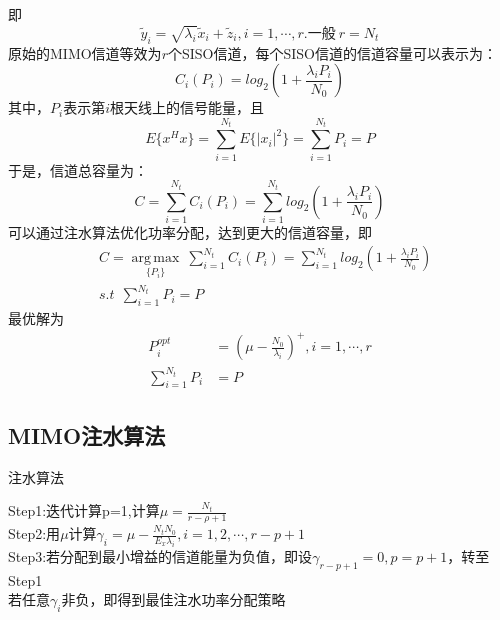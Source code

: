 即
\begin{equation}
    \tilde{y}_i=\sqrt{\lambda_i}\tilde{x}_i+\tilde{z}_i, i=1,\cdots,r.一般\ r=N_t
\end{equation}
原始的MIMO信道等效为$r$个SISO信道，每个SISO信道的信道容量可以表示为：
\begin{equation}
    C_i(P_i)=log_2(1+\frac{\lambda_iP_i}{N_0})
\end{equation}
其中，$P_i$表示第$i$根天线上的信号能量，且
\begin{equation}
    E\{x^Hx\}=\sum_{i=1}^{N_t}E\{|x_i|^2\}=\sum_{i=1}^{N_t}P_i=P
\end{equation}
于是，信道总容量为：
\begin{equation}
    C=\sum_{i=1}^{N_t}C_i(P_i)=\sum_{i=1}^{N_t}log_2(1+\frac{\lambda_iP_i}{N_0})
\end{equation}
可以通过注水算法优化功率分配，达到更大的信道容量，即
\begin{equation}
    \begin{aligned}
        & C={\underset{\{P_i\}} {\operatorname {arg\,max}}}\ \sum_{i=1}^{N_t}C_i(P_i)=\sum_{i=1}^{N_t}log_2(1+\frac{\lambda_iP_i}{N_0}) \\
        & s.t\ \  \sum_{i=1}^{N_t}P_i=P 
    \end{aligned}
\end{equation}
最优解为   
\begin{equation}
    \begin{aligned}
        P_i^{opt}&=(\mu -\frac{N_0}{\lambda_i})^+, i=1,\cdots,r \\
        \sum_{i=1}^{N_t}P_i&=P
    \end{aligned}
\end{equation}

\subsection{MIMO注水算法}
\begin{algorithm}
    \caption{注水算法}
    Step1:迭代计算p=1,计算$\mu=\frac{N_t}{r-\rho+1}$ \\
    Step2:用$\mu$计算$\gamma_i=\mu-\frac{N_tN_0}{E_x\lambda_i},i=1,2,\cdots,r-p+1$ \\
    Step3:若分配到最小增益的信道能量为负值，即设$\gamma_{r-p+1}=0,p=p+1$，转至Step1 \\
    若任意$\gamma_i$非负，即得到最佳注水功率分配策略
\end{algorithm}
